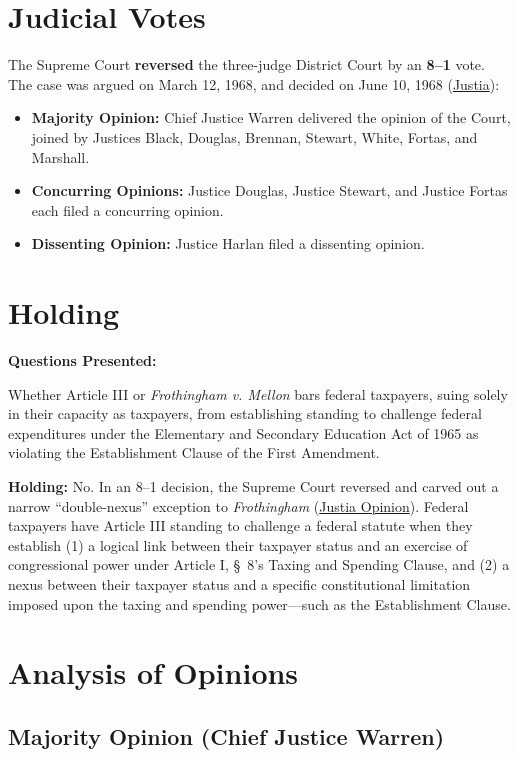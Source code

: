 \documentclass[12pt]{article}
\begin{document}
\section{Judicial Votes}
The Supreme Court \textbf{reversed} the three-judge District Court by an \textbf{8--1} vote. The case was argued on March 12, 1968, and decided on June 10, 1968 (\href{https://supreme.justia.com/cases/federal/us/392/83/}{Justia}):

\begin{itemize}
    \item \textbf{Majority Opinion:} Chief Justice Warren delivered the opinion of the Court, joined by Justices Black, Douglas, Brennan, Stewart, White, Fortas, and Marshall.
    \item \textbf{Concurring Opinions:} Justice Douglas, Justice Stewart, and Justice Fortas each filed a concurring opinion.
    \item \textbf{Dissenting Opinion:} Justice Harlan filed a dissenting opinion.
\end{itemize}

\section{Holding}
\textbf{Questions Presented:}

Whether Article III or \textit{Frothingham v. Mellon} bars federal taxpayers, suing solely in their capacity as taxpayers, from establishing standing to challenge federal expenditures under the Elementary and Secondary Education Act of 1965 as violating the Establishment Clause of the First Amendment.

\textbf{Holding:} No. In an 8--1 decision, the Supreme Court reversed and carved out a narrow ``double-nexus'' exception to \textit{Frothingham} (\href{https://supreme.justia.com/cases/federal/us/392/83/}{Justia Opinion}). Federal taxpayers have Article III standing to challenge a federal statute when they establish (1) a logical link between their taxpayer status and an exercise of congressional power under Article I, \S\ 8's Taxing and Spending Clause, and (2) a nexus between their taxpayer status and a specific constitutional limitation imposed upon the taxing and spending power---such as the Establishment Clause.

\section{Analysis of Opinions}
\subsection{Majority Opinion (Chief Justice Warren)}
\end{document}
